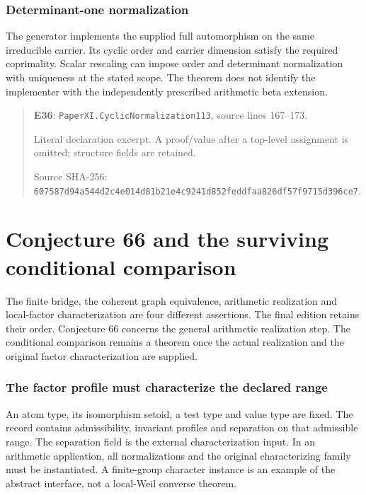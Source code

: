 \documentclass[10pt,oneside]{book}
\begin{document}
\subsection{Determinant-one normalization}
\label{guide:E36}
The generator implements the supplied full automorphism on the same irreducible carrier. Its cyclic order and carrier dimension satisfy the required coprimality.
Scalar rescaling can impose order and determinant normalization with uniqueness at the stated scope. The theorem does not identify the implementer with the independently prescribed arithmetic beta extension.

\begin{quote}\footnotesize\textbf{E36}: \nolinkurl{PaperXI.CyclicNormalization113}, source lines 167--173.\par Literal declaration excerpt. A proof/value after a top-level assignment is omitted; structure fields are retained.\par Source SHA-256: {\scriptsize\texttt{607587d94a544d2c4e014d81b21e4c9241d852feddfaa826df57f9715d396ce7}}.\end{quote}


\chapter{Conjecture 66 and the surviving conditional comparison}
The finite bridge, the coherent graph equivalence, arithmetic realization and local-factor characterization are four different assertions. The final edition retains their order. Conjecture 66 concerns the general arithmetic realization step. The conditional comparison remains a theorem once the actual realization and the original factor characterization are supplied.

\subsection{The factor profile must characterize the declared range}
\label{guide:E37}
An atom type, its isomorphism setoid, a test type and value type are fixed. The record contains admissibility, invariant profiles and separation on that admissible range.
The separation field is the external characterization input. In an arithmetic application, all normalizations and the original characterizing family must be instantiated. A finite-group character instance is an example of the abstract interface, not a local-Weil converse theorem.
\end{document}
